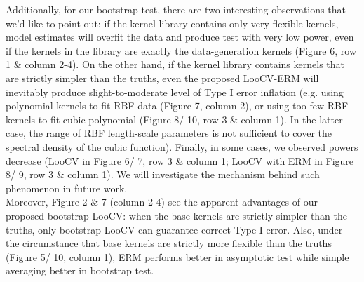 \documentclass[11pt]{article}
\begin{document}
Additionally, for our bootstrap test, there are two interesting observations that we'd like to point out: if the kernel library contains only very flexible kernels, model estimates will overfit the data and produce test with very low power, even if the kernels in the library are exactly the data-generation kernels (Figure 6, row 1 \& column 2-4). On the other hand, if the kernel library contains kernels that are strictly simpler than the truths, even the proposed LooCV-ERM will inevitably produce slight-to-moderate level of Type I error inflation (e.g. using polynomial kernels to fit RBF data (Figure 7, column 2), or using too few RBF kernels to fit cubic polynomial (Figure 8/ 10, row 3 \& column 1). In the latter case, the range of RBF length-scale parameters is not sufficient to cover the spectral density of the cubic function). Finally, in some cases, we observed powers decrease (LooCV in Figure 6/ 7, row 3 \& column 1; LooCV with ERM in Figure 8/ 9, row 3 \& column 1). We will investigate the mechanism behind such phenomenon in future work.\\

Moreover, Figure 2 \& 7 (column 2-4) see the apparent advantages of our proposed bootstrap-LooCV: when the base kernels are strictly simpler than the truths, only bootstrap-LooCV can guarantee correct Type I error. Also, under the circumstance that base kernels are strictly more flexible than the truths (Figure 5/ 10, column 1), ERM performs better in asymptotic test while simple averaging better in bootstrap test.
\end{document}
